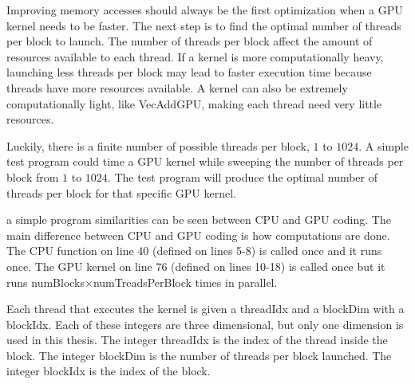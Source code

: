 Improving memory accesses should always be the first optimization when a GPU kernel needs to be faster.
The next step is to find the optimal number of threads per block to launch.
The number of threads per block affect the amount of resources available to each thread.
If a kernel is more computationally heavy, launching less threads per block may lead to faster execution time because threads have more resources available. 
A kernel can also be extremely computationally light, like VecAddGPU, making each thread need very little resources.

Luckily, there is a finite number of possible threads per block, $1$ to $1024$.
A simple test program could time a GPU kernel while sweeping the number of threads per block from $1$ to $1024$.
The test program will produce the optimal number of threads per block for that specific GPU kernel.

a simple program similarities can be seen between CPU and GPU coding.
The main difference between CPU and GPU coding is how computations are done.
The CPU function on line 40 (defined on lines 5-8) is called once and it runs once.
The GPU kernel on line 76 (defined on lines 10-18) is called once but it runs numBlocks$\times$numTreadsPerBlock times in parallel.

Each thread that executes the kernel is given a threadIdx and a blockDim with a blockIdx.
Each of these integers are three dimensional, but only one dimension is used in this thesis.
The integer threadIdx is the index of the thread inside the block.
The integer blockDim is the number of threads per block launched.
The integer blockIdx is the index of the block.

